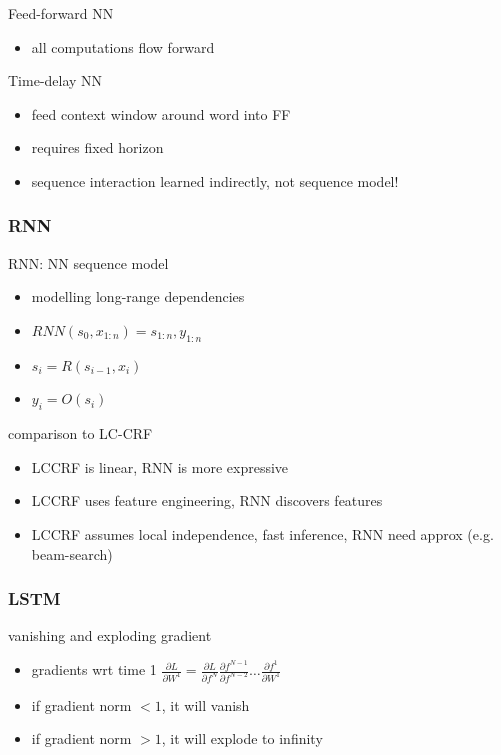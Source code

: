 \documentclass[]{article}
\theoremstyle{definition}
\begin{document}
Feed-forward NN
\begin{itemize}
    \item all computations flow forward
\end{itemize}

Time-delay NN
\begin{itemize}
    \item feed context window around word into FF
    \item requires fixed horizon
    \item sequence interaction learned indirectly, not sequence model!
\end{itemize}

\subsubsection{RNN}%
\label{ssub:rnn}

RNN: NN sequence model
\begin{itemize}
    \item modelling long-range dependencies
    \item $RNN(s_0, x_{1:n}) = s_{1:n}, y_{1:n}$
    \item $s_i = R(s_{i-1}, x_i)$
    \item $y_i = O(s_i)$
\end{itemize}

comparison to LC-CRF
\begin{itemize}
    \item LCCRF is linear, RNN is more expressive
    \item LCCRF uses feature engineering, RNN discovers features
    \item LCCRF assumes local independence, fast inference, RNN need approx (e.g. beam-search)
\end{itemize}


\subsubsection{LSTM}%
\label{ssub:lstm}

vanishing and exploding gradient
\begin{itemize}
    \item gradients wrt time 1 $ \frac{\partial L}{\partial W^1} =
        \frac{\partial L}{\partial f^N}
        \frac{\partial f^{N-1}}{\partial f^{N-2}} \ldots
        \frac{\partial f^1}{\partial W^1} $
    \item if gradient norm $<1$, it will vanish
    \item if gradient norm $>1$, it will explode to infinity
\end{itemize}
\end{document}
